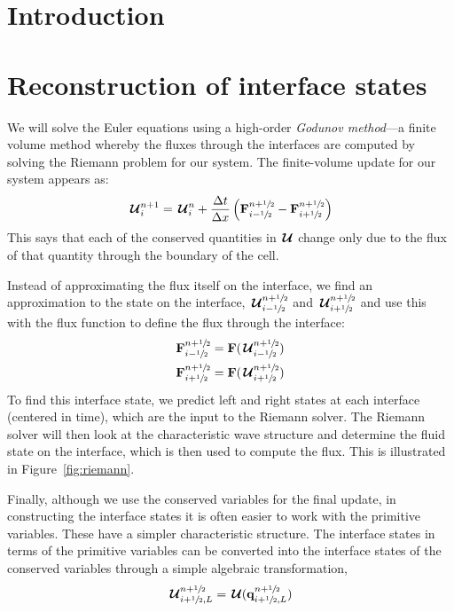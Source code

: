 \label{ch:compressible}

\section{Introduction}

\label{sec:eulermeth:intro}



\section{Reconstruction of interface states}

\label{sec:onedrecon}

We will solve the Euler equations using a high-order {\em Godunov
  method}---a finite volume method whereby the fluxes through the
interfaces are computed by solving the Riemann problem for our system.
The finite-volume update for our system appears as:
\begin{equation}
{\,\boldsymbol{\mathcal{U}}}^{n+1}_i = {\,\boldsymbol{\mathcal{U}}}^n_i + \frac{\Delta t}{\Delta x} \left ( {\bf F}_{i-{\sfrac{1}{2}}}^{n+{\sfrac{1}{2}}} - {\bf F}_{i+{\sfrac{1}{2}}}^{n+{\sfrac{1}{2}}} \right )
\end{equation}
This says that each of the conserved quantities in ${\,\boldsymbol{\mathcal{U}}}$ change only due
to the flux of that quantity through the boundary of the cell.

Instead of approximating the flux itself on the interface, we find an
approximation to the state on the interface, ${\,\boldsymbol{\mathcal{U}}}_{i-{\sfrac{1}{2}}}^{n+{\sfrac{1}{2}}}$ and
${\,\boldsymbol{\mathcal{U}}}_{i+{\sfrac{1}{2}}}^{n+{\sfrac{1}{2}}}$ and use this with the flux function to define the
flux through the interface:
\begin{align}
{\bf F}_{i-{\sfrac{1}{2}}}^{n+{\sfrac{1}{2}}} &= {\bf F}({\,\boldsymbol{\mathcal{U}}}_{i-{\sfrac{1}{2}}}^{n+{\sfrac{1}{2}}}) \\
{\bf F}_{i+{\sfrac{1}{2}}}^{n+{\sfrac{1}{2}}} &= {\bf F}({\,\boldsymbol{\mathcal{U}}}_{i+{\sfrac{1}{2}}}^{n+{\sfrac{1}{2}}})
\end{align}
To find this interface state, we predict left and right states at each
interface (centered in time), which are the input to the Riemann
solver.  The Riemann solver will then look at the characteristic wave
structure and determine the fluid state on the interface, which is
then used to compute the flux.  This is illustrated in
Figure~\ref{fig:riemann}.

Finally, although we use the conserved variables for the final update,
in constructing the interface states it is often easier to work with
the primitive variables.  These have a simpler characteristic
structure.  The interface states in terms of the primitive variables
can be converted into the interface states of the conserved variables
through a simple algebraic transformation,
\begin{equation}
{\,\boldsymbol{\mathcal{U}}}_{i+{\sfrac{1}{2}},L}^{n+{\sfrac{1}{2}}} = {\,\boldsymbol{\mathcal{U}}}({\bf q}_{i+{\sfrac{1}{2}},L}^{n+{\sfrac{1}{2}}})
\end{equation}

